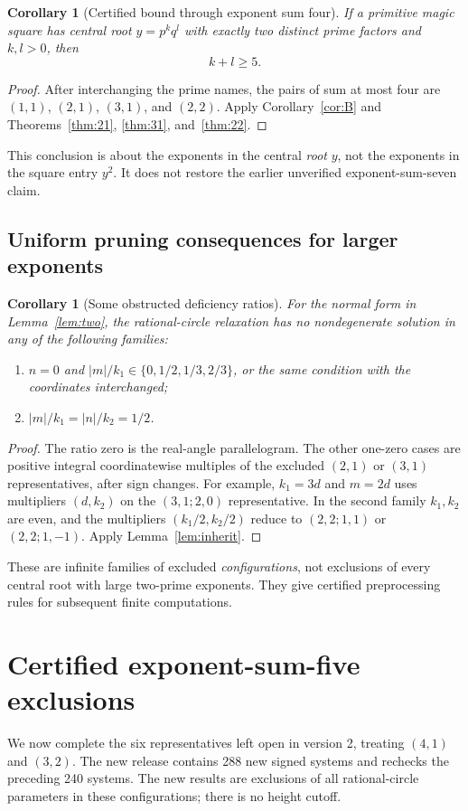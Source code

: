 \documentclass[11pt]{article}
\newtheorem{corollary}[theorem]{Corollary}
\theoremstyle{definition}\newtheorem{definition}[theorem]{Definition}
\theoremstyle{remark}\newtheorem{remark}[theorem]{Remark}
\begin{document}
\begin{corollary}[Certified bound through exponent sum four]\label{cor:bound4}
If a primitive magic square has central root $y=p^kq^l$ with exactly two distinct prime factors and $k,l>0$, then
\[
\boxed{k+l\ge5.}
\]
\end{corollary}
\begin{proof}
After interchanging the prime names, the pairs of sum at most four are $(1,1)$, $(2,1)$, $(3,1)$, and $(2,2)$. Apply Corollary~\ref{cor:B} and Theorems~\ref{thm:21}, \ref{thm:31}, and~\ref{thm:22}.
\end{proof}
This conclusion is about the exponents in the central \emph{root} $y$, not the exponents in the square entry $y^2$. It does not restore the earlier unverified exponent-sum-seven claim.

\subsection{Uniform pruning consequences for larger exponents}
\begin{corollary}[Some obstructed deficiency ratios]\label{cor:ratios}
For the normal form in Lemma~\ref{lem:two}, the rational-circle relaxation has no nondegenerate solution in any of the following families:
\begin{enumerate}
\item $n=0$ and $|m|/k_1\in\{0,1/2,1/3,2/3\}$, or the same condition with the coordinates interchanged;
\item $|m|/k_1=|n|/k_2=1/2$.
\end{enumerate}
\end{corollary}
\begin{proof}
The ratio zero is the real-angle parallelogram. The other one-zero cases are positive integral coordinatewise multiples of the excluded $(2,1)$ or $(3,1)$ representatives, after sign changes. For example, $k_1=3d$ and $m=2d$ uses multipliers $(d,k_2)$ on the $(3,1;2,0)$ representative. In the second family $k_1,k_2$ are even, and the multipliers $(k_1/2,k_2/2)$ reduce to $(2,2;1,1)$ or $(2,2;1,-1)$. Apply Lemma~\ref{lem:inherit}.
\end{proof}
These are infinite families of excluded \emph{configurations}, not exclusions of every central root with large two-prime exponents. They give certified preprocessing rules for subsequent finite computations.

\section{Certified exponent-sum-five exclusions}\label{sec:degree5}
We now complete the six representatives left open in version 2, treating $(4,1)$ and $(3,2)$. The new release contains 288 new signed systems and rechecks the preceding 240 systems. The new results are exclusions of all rational-circle parameters in these configurations; there is no height cutoff.
\end{document}
